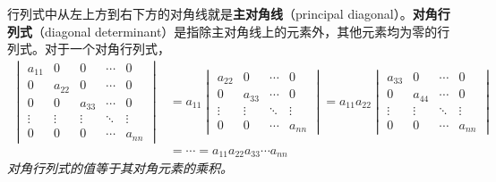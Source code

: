     行列式中从左上方到右下方的对角线就是\textbf{主对角线}（principal diagonal）。\textbf{对角行列式}（diagonal determinant）是指除主对角线上的元素外，其他元素均为零的行列式。对于一个对角行列式，
    \begin{equation}
        \begin{aligned}
            \begin{vmatrix}
                a_{11} & 0 & 0 & \cdots & 0 \\
                0 & a_{22} & 0 & \cdots & 0 \\
                0 & 0 & a_{33} & \cdots & 0 \\
                \vdots & \vdots & \vdots & \ddots & \vdots \\
                0 & 0 & 0 & \cdots & a_{nn}
            \end{vmatrix} &= a_{11}\begin{vmatrix}
                a_{22} & 0 & \cdots & 0 \\
                0 & a_{33} & \cdots & 0 \\
                \vdots & \vdots & \ddots & \vdots \\
                0 & 0 & \cdots & a_{nn}
            \end{vmatrix} = a_{11}a_{22}\begin{vmatrix}
                a_{33} & 0 & \cdots & 0 \\
                0 & a_{44} & \cdots & 0 \\
                \vdots & \vdots & \ddots & \vdots \\
                0 & 0 & \cdots & a_{nn}
            \end{vmatrix} \\
            &= \cdots = a_{11}a_{22}a_{33}\cdots a_{nn}
        \end{aligned}
    \label{eq:8.33}
    \end{equation}
    \textit{对角行列式的值等于其对角元素的乘积。}

